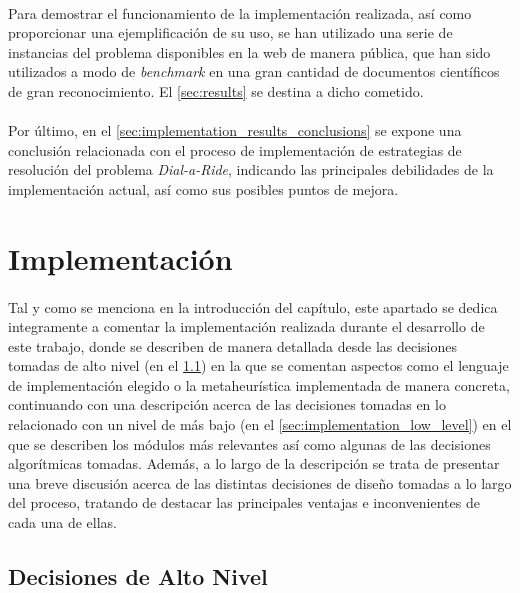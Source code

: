 \documentclass{subfiles}
\begin{document}
      \paragraph{}
      Para demostrar el funcionamiento de la implementación realizada, así como proporcionar una ejemplificación de su uso, se han utilizado una serie de instancias del problema disponibles en la web de manera pública, que han sido utilizados a modo de \emph{benchmark} en una gran cantidad de documentos científicos de gran reconocimiento. El \cref{sec:results} se destina a dicho cometido.

      \paragraph{}
      Por último, en el \cref{sec:implementation_results_conclusions} se expone una conclusión relacionada con el proceso de implementación de estrategias de resolución del problema \emph{Dial-a-Ride}, indicando las principales debilidades de la implementación actual, así como sus posibles puntos de mejora.

    \section{Implementación}
    \label{sec:implementation}

      \paragraph{}
      Tal y como se menciona en la introducción del capítulo, este apartado se dedica integramente a comentar la implementación realizada durante el desarrollo de este trabajo, donde se describen de manera detallada desde las decisiones tomadas de alto nivel (en el \cref{sec:implementation_high_level}) en la que se comentan aspectos como el lenguaje de implementación elegido o la metaheurística implementada de manera concreta, continuando con una descripción acerca de las decisiones tomadas en lo relacionado con un nivel de más bajo (en el \cref{sec:implementation_low_level}) en el que se describen los módulos más relevantes así como algunas de las decisiones algorítmicas tomadas. Además, a lo largo de la descripción se trata de presentar una breve discusión acerca de las distintas decisiones de diseño tomadas a lo largo del proceso, tratando de destacar las principales ventajas e inconvenientes de cada una de ellas.

      \subsection{Decisiones de Alto Nivel}
      \label{sec:implementation_high_level}
\end{document}
